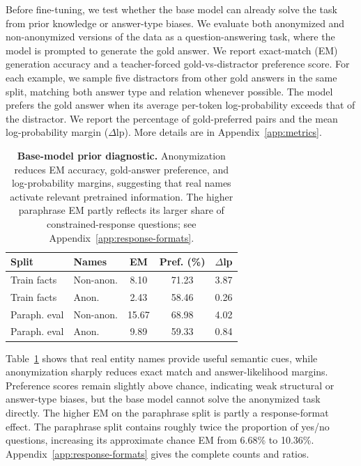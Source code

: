 \documentclass[11pt]{article}
\begin{document}
Before fine-tuning, we test whether the base model can already solve the task
from prior knowledge or answer-type biases. We evaluate both anonymized and
non-anonymized versions of the data as a question-answering task, where the
model is prompted to generate the gold answer. We report exact-match (EM)
generation accuracy and a teacher-forced gold-vs-distractor preference score.
For each example, we sample five distractors from other gold answers in the
same split, matching both answer type and relation whenever possible. The model prefers the gold
answer when its average per-token log-probability exceeds that of the
distractor. We report the percentage of gold-preferred pairs and the mean
log-probability margin ($\Delta$lp). More details are in Appendix~\ref{app:metrics}.
\begin{table}[t]
\centering
\small
\begin{tabular}{llccc}
\toprule
Split & Names & EM & Pref. (\%) & $\Delta$lp \\
\midrule
Train facts     & Non-anon. & 8.10  & 71.23 & 3.87 \\
Train facts     & Anon.     & 2.43  & 58.46 & 0.26 \\
Paraph. eval    & Non-anon. & 15.67 & 68.98 & 4.02 \\
Paraph. eval    & Anon.     & 9.89  & 59.33 & 0.84 \\
\bottomrule
\end{tabular}
\caption{
\textbf{Base-model prior diagnostic.}
Anonymization reduces EM accuracy, gold-answer preference, and
log-probability margins, suggesting that real names activate relevant pretrained
information. The higher paraphrase EM
partly reflects its larger share of constrained-response questions; see
Appendix~\ref{app:response-formats}.
}
\label{tab:base-prior}
\end{table}

Table~\ref{tab:base-prior} shows that real entity names provide useful semantic
cues, while anonymization sharply reduces exact match and answer-likelihood
margins. Preference scores remain slightly above chance, indicating weak
structural or answer-type biases, but the base model cannot solve the
anonymized task directly. The higher EM on the paraphrase split is partly a
response-format effect. The paraphrase split contains roughly twice the proportion of
yes/no questions, increasing its approximate chance EM from 6.68\% to 10.36\%.
Appendix~\ref{app:response-formats} gives the complete counts and ratios.
\end{document}
